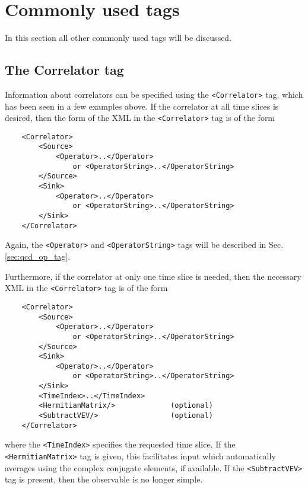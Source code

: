 \documentclass[12pt]{article}
\newcommand{\vb}{\texttt}
\begin{document}
\section{Commonly used tags}

In this section all other commonly used tags will be discussed.

\subsection{The Correlator tag}

Information about correlators can be specified using the
\vb{<Correlator>} tag, which has been seen in a few examples above.
If the correlator at all time slices is desired, then the
form of the XML in the \vb{<Correlator>} tag is of the form
\begin{verbatim}
    <Correlator>
        <Source>
            <Operator>..</Operator>
                or <OperatorString>..</OperatorString>
        </Source>
        <Sink>
            <Operator>..</Operator>
                or <OperatorString>..</OperatorString>
        </Sink>
    </Correlator>
\end{verbatim}
Again, the \vb{<Operator>} and \vb{<OperatorString>} tags
will be described in Sec. \ref{sec:qcd_op_tag}.

Furthermore, if the correlator at only one time slice is needed,
then the necessary XML in the \vb{<Correlator>} tag is of the form
\begin{verbatim}
    <Correlator>
        <Source>
            <Operator>..</Operator>
                or <OperatorString>..</OperatorString>
        </Source>
        <Sink>
            <Operator>..</Operator>
                or <OperatorString>..</OperatorString>
        </Sink>
        <TimeIndex>..</TimeIndex>
        <HermitianMatrix/>             (optional)
        <SubtractVEV/>                 (optional)
    </Correlator>
\end{verbatim}
where the \vb{<TimeIndex>} specifies the requested time slice.
If the \vb{<HermitianMatrix>} tag is given, this facilitates
input which automatically averages using the complex conjugate
elements, if available. If the \vb{<SubtractVEV>} tag is present,
then the observable is no longer simple.
\end{document}
